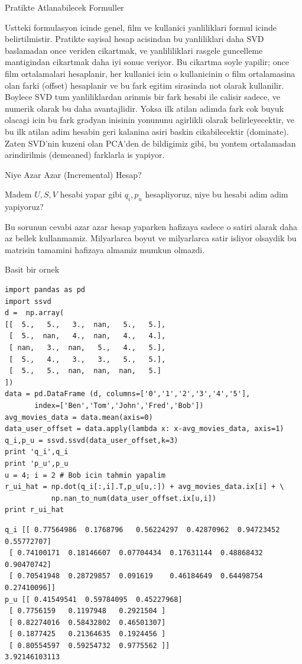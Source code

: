 \documentclass[12pt,fleqn]{article}\usepackage{../common}
\begin{document}
Pratikte Atlanabilecek Formuller

Ustteki formulasyon icinde genel, film ve kullanici yanliliklari formul
icinde belirtilmistir. Pratikte sayisal hesap acisindan bu yanliliklari
daha SVD baslamadan once veriden cikartmak, ve yanlililiklari rasgele
guncelleme mantigindan cikartmak daha iyi sonuc veriyor. Bu cikartma soyle
yapilir; once film ortalamalari hesaplanir, her kullanici icin o
kullanicinin o film ortalamasina olan farki (offset) hesaplanir ve bu fark
egitim sirasinda not olarak kullanilir. Boylece SVD tum yanliliklardan
arinmis bir fark hesabi ile calisir sadece, ve numerik olarak bu daha
avantajlidir. Yoksa ilk atilan adimda fark cok buyuk olacagi icin bu fark
gradyan inisinin yonununu agirlikli olarak belirleyecektir, ve bu ilk
atilan adim hesabin geri kalanina asiri baskin cikabilecektir
(dominate). Zaten SVD'nin kuzeni olan PCA'den de bildigimiz gibi, bu yontem
ortalamadan arindirilmis (demeaned) farklarla is yapiyor.

Niye Azar Azar (Incremental) Hesap? 

Madem $U,S,V$ hesabi yapar gibi $q_i,p_u$ hesapliyoruz, niye bu hesabi adim
adim yapiyoruz? 

Bu sorunun cevabi azar azar hesap yaparken hafizaya sadece o satiri alarak
daha az bellek kullanmamiz. Milyarlarca boyut ve milyarlarca satir isliyor
olsaydik bu matrisin tamamini hafizaya almamiz mumkun olmazdi. 

Basit bir ornek

\begin{verbatim}
import pandas as pd
import ssvd
d =  np.array(
[[  5.,   5.,   3.,  nan,   5.,   5.],
 [  5.,  nan,   4.,  nan,   4.,   4.],
 [ nan,   3.,  nan,   5.,   4.,   5.],
 [  5.,   4.,   3.,   3.,   5.,   5.],
 [  5.,   5.,  nan,  nan,  nan,   5.]
])
data = pd.DataFrame (d, columns=['0','1','2','3','4','5'],
       index=['Ben','Tom','John','Fred','Bob'])
avg_movies_data = data.mean(axis=0)
data_user_offset = data.apply(lambda x: x-avg_movies_data, axis=1)
q_i,p_u = ssvd.ssvd(data_user_offset,k=3)
print 'q_i',q_i
print 'p_u',p_u
u = 4; i = 2 # Bob icin tahmin yapalim
r_ui_hat = np.dot(q_i[:,i].T,p_u[u,:]) + avg_movies_data.ix[i] + \
           np.nan_to_num(data_user_offset.ix[u,i])
print r_ui_hat
\end{verbatim}

\begin{verbatim}
q_i [[ 0.77564986  0.1768796   0.56224297  0.42870962  0.94723452  0.55772707]
 [ 0.74100171  0.18146607  0.07704434  0.17631144  0.48868432  0.90470742]
 [ 0.70541948  0.28729857  0.091619    0.46184649  0.64498754  0.27410096]]
p_u [[ 0.41549541  0.59784095  0.45227968]
 [ 0.7756159   0.1197948   0.2921504 ]
 [ 0.82274016  0.58432802  0.46501307]
 [ 0.1877425   0.21364635  0.1924456 ]
 [ 0.80554597  0.59254732  0.9775562 ]]
3.92146103113
\end{verbatim}
\end{document}
